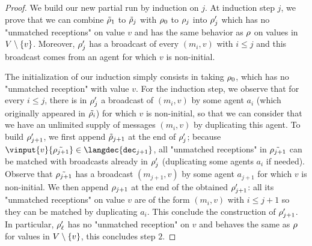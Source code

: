 \begin{proof}

We build our new partial run by induction on $j$. At induction step $j$, we prove that we can combine $\Tilde{\rho}_1$ to $\Tilde{\rho}_j$ with $\rho_0$ to $\rho_j$ into $\rho_j'$ which has no "unmatched receptions" on value $v$ and has the same behavior as $\rho$ on values in $V \setminus \{v\}$. Moreover, $\rho_j'$ has a broadcast of every $(m_i,v)$ with $i \leq j$ and this broadcast comes from an agent for which $v$ is non-initial. 

The initialization of our induction simply consists in taking $\rho_0$, which has no "unmatched reception" with value $v$. For the induction step, we observe that for every $i \leq j$, there is in $\rho_j'$ a broadcast of $(m_i,v)$ by some agent $a_i$ (which originally appeared in $\Tilde{\rho_i}$) for which $v$ is non-initial, so that we can consider that we have an unlimited supply of messages $(m_i,v)$ by duplicating this agent. 
To build $\rho_{j+1}'$, we first append $\Tilde{\rho}_{j+1}$ at the end of $\rho_j'$; because $\vinput{v}{\Tilde{\run_{j+1}}} \in \langdec{\decsymb_{j+1}}$, all "unmatched receptions" in $\Tilde{\rho_{j+1}}$ can be matched with broadcasts already in $\rho_j'$ (duplicating some agents $a_i$ if needed). Observe that $\Tilde{\rho_{j+1}}$ has a broadcast  $(m_{j+1},v)$ by some agent $a_{j+1}$ for which $v$ is non-initial. We then append $\rho_{j+1}$ at the end of the obtained $\rho_{j+1}'$: all its "unmatched receptions" on value $v$ are of the form $(m_i,v)$ with $i \leq j+1$ so they can be matched by duplicating $a_i$. This conclude the construction of $\rho_{j+1}'$. In particular, $\rho_{\ell}'$ has no "unmatched reception" on $v$ and behaves the same as $\rho$ for values in $V \setminus \{v\}$, this concludes step $2$.



\end{proof}
